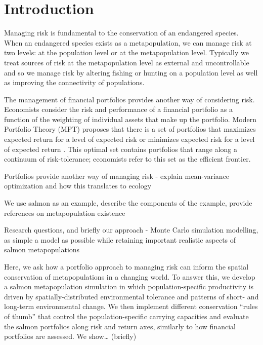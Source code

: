 \section{Introduction}

Managing risk is fundamental to the conservation of an endangered
species. When an endangered species exists as a metapopulation, we can
manage risk at two levels: at the population level or at the
metapopulation level. Typically we treat sources of risk at the
metapopulation level as external and uncontrollable and so we manage
risk by altering fishing or hunting on a population level as well as
improving the connectivity of populations.

The management of financial portfolios provides another way of
considering risk. Economists consider the risk and performance of a
financial portfolio as a function of the weighting of individual assets
that make up the portfolio. Modern Portfolio Theory (MPT) proposes that
there is a set of portfolios that maximizes expected return for a level
of expected risk or minimizes expected risk for a level of expected
return \citep{markowitz1952, markowitz1959}. This optimal set contains
portfolios that range along a continuum of risk-tolerance; economists
refer to this set as the efficient frontier.

Portfolios provide another way of managing risk - explain mean-variance
optimization and how this translates to ecology
\citep{figge2004}\citep{hoekstra2012}
\citep[\citet{ando2012}]{ando2011}\citep[\citet{markowitz1959}]{markowitz1952}

We use salmon as an example, describe the components of the example,
provide references on metapopulation existence \citep{schindler2010}

Research questions, and briefly our approach - Monte Carlo simulation
modelling, as simple a model as possible while retaining important
realistic aspects of salmon metapopulations

Here, we ask how a portfolio approach to managing risk can inform the
spatial conservation of metapopulations in a changing world. To answer
this, we develop a salmon metapopulation simulation in which
population-specific productivity is driven by spatially-distributed
environmental tolerance and patterns of short- and long-term
environmental change. We then implement different conservation ``rules
of thumb'' that control the population-specific carrying capacities and
evaluate the salmon portfolios along risk and return axes, similarly to
how financial portfolios are assessed. We show\ldots{} (briefly)

